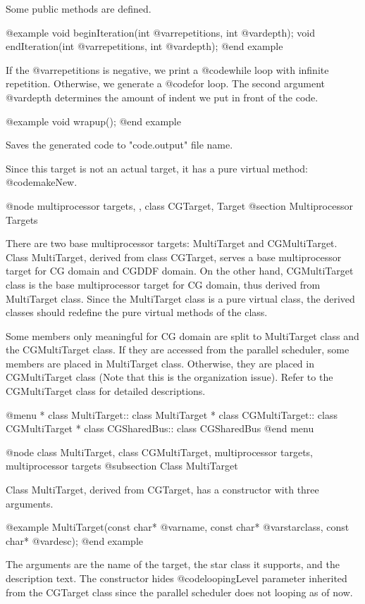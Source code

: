 Some public methods are defined.

@example
void beginIteration(int @var{repetitions}, int @var{depth});
void endIteration(int @var{repetitions}, int @var{depth});
@end example

If the @var{repetitions} is negative, we print a @code{while} loop
with infinite repetition. Otherwise, we generate a @code{for}
loop. The second argument @var{depth} determines the amount of indent
we put in front of the code.

@example
void wrapup();
@end example

Saves the generated code to "code.output" file name.

Since this target is not an actual target, it has a pure virtual method:
@code{makeNew}.

@node multiprocessor targets, , class CGTarget, Target
@section Multiprocessor Targets

There are two base multiprocessor targets: MultiTarget and CGMultiTarget.
Class MultiTarget, derived from class CGTarget, serves a base multiprocessor
target for CG domain and CGDDF domain. On the other hand, CGMultiTarget
class is the base multiprocessor target for CG domain, thus derived from
MultiTarget class. Since the MultiTarget class is a pure virtual class,
the derived classes should redefine the pure virtual methods of the class.

Some members only meaningful for CG domain are split to MultiTarget
class and the CGMultiTarget class. If they are accessed from the parallel
scheduler, some members are placed in MultiTarget class. Otherwise, they
are placed in CGMultiTarget class (Note that this is the organization issue).
Refer to the CGMultiTarget class for detailed descriptions.

@menu
* class MultiTarget::		class MultiTarget
* class CGMultiTarget::		class CGMultiTarget
* class CGSharedBus::		class CGSharedBus
@end menu

@node class MultiTarget, class CGMultiTarget, multiprocessor targets, multiprocessor targets
@subsection Class MultiTarget

Class MultiTarget, derived from CGTarget, has a constructor with three
arguments.

@example
MultiTarget(const char* @var{name}, const char* @var{starclass}, const char* @var{desc});
@end example

The arguments are the name of the target, the star class it supports, and the
description text. The constructor hides @code{loopingLevel} parameter
inherited from the CGTarget class since the parallel scheduler does not
looping as of now.

